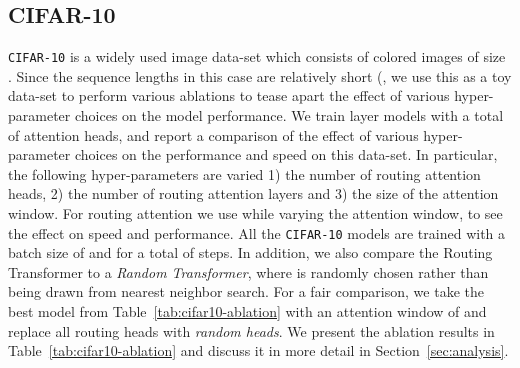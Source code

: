 \documentclass[a4paper]{article}
\begin{document}
\subsection{CIFAR-10}\label{sec:cifar}
\texttt{CIFAR-10} is a widely used image data-set which consists of  colored
images of size . Since the sequence lengths in this case are relatively
short (, we use this as a toy data-set to perform
various ablations to tease apart the effect of various hyper-parameter choices
on the model performance. We train  layer models
with a total of  attention heads, and report a comparison of the effect 
of various hyper-parameter choices on the performance and speed on this data-set. 
In particular, the following hyper-parameters are varied 1) the number of routing attention
heads, 2) the number of routing attention layers and 3) the size of the attention window.
For routing attention we use  while varying the attention window, to see the
effect on speed and performance. All the \texttt{CIFAR-10} 
models are trained with a batch size of
 and for a total of  steps. 
In addition, we also compare the Routing Transformer to a \emph{Random Transformer},
where  is randomly chosen rather than being drawn from nearest neighbor search.
For a fair comparison, we take the best model from Table~\ref{tab:cifar10-ablation}
with an attention window of  and replace all routing heads with \emph{random heads}.
We present the ablation results in Table~\ref{tab:cifar10-ablation} and discuss
it in more detail in Section~\ref{sec:analysis}.
\end{document}
